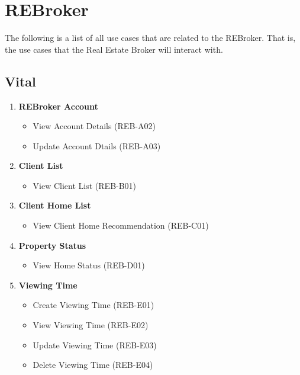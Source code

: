 \documentclass[11pt]{article}
\begin{document}
	\section{REBroker}
	\begin{flushleft}
		The following is a list of all use cases that are related to the REBroker. That is, the use cases that the Real Estate Broker will interact with.
	\end{flushleft}
		
		\subsection{Vital}
		\begin{enumerate}[i]
			\item \textbf{REBroker Account}
			\begin{itemize}
				\item View Account Details (REB-A02)
				\item Update Account Dtails (REB-A03)
			\end{itemize}
			
			\item \textbf{Client List}
			\begin{itemize}
				\item View Client List (REB-B01)
			\end{itemize}
			
			\item \textbf{Client Home List}
			\begin{itemize}
				\item View Client Home Recommendation (REB-C01)
			\end{itemize}
			
			\item \textbf{Property Status}
			\begin{itemize}
				\item View Home Status (REB-D01)
			\end{itemize}
			
			\item \textbf{Viewing Time}
			\begin{itemize}
				\item Create Viewing Time (REB-E01)
				\item View Viewing Time (REB-E02)
				\item Update Viewing Time (REB-E03)
				\item Delete Viewing Time (REB-E04)
			\end{itemize}
		\end{enumerate}
		
\end{document}

